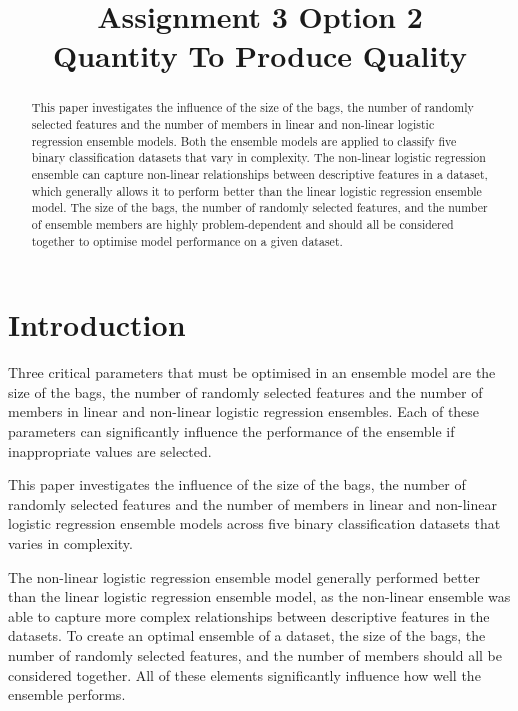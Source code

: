 \documentclass[10pt, conference]{IEEEtran}
\begin{document}
\title{Assignment 3 Option 2 \\
Quantity To Produce Quality
}

\author{
}

\maketitle

\begin{abstract}
This paper investigates the influence of the size of the bags, the number of randomly selected features and
the number of members in linear and non-linear logistic regression ensemble models. Both the ensemble models
are applied to classify five binary classification datasets that vary in complexity. The non-linear logistic
regression ensemble can capture non-linear relationships between descriptive features in a dataset, which
generally allows it to perform better than the linear logistic regression ensemble model. The size of the bags,
the number of randomly selected features, and the number of ensemble members are highly problem-dependent and
should all be considered together to optimise model performance on a given dataset.
\end{abstract}

\section{Introduction}

Three critical parameters that must be optimised in an ensemble model are the size of the bags,
the number of randomly selected features and the number of members in linear and non-linear logistic
regression ensembles. Each of these parameters can significantly influence the performance of the ensemble
if inappropriate values are selected.

This paper investigates the influence of the size of the bags, the number of randomly selected features and
the number of members in linear and non-linear logistic regression ensemble models across five binary classification
datasets that varies in complexity.

The non-linear logistic regression ensemble model generally performed better than the linear logistic regression
ensemble model, as the non-linear ensemble was able to capture more complex relationships between descriptive
features in the datasets. To create an optimal ensemble of a dataset, the size of the bags, the number of
randomly selected features, and the number of members should all be considered together. All of these elements
significantly influence how well the ensemble performs.
\end{document}
